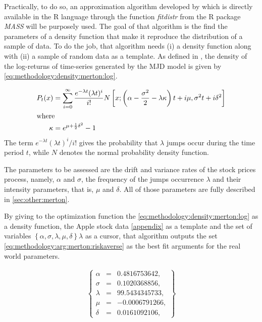 \documentclass[12pt]{report}
\begin{document}
Practically, to do so, an approximation algorithm developed by \citet{MASS} which is directly available in the R language through the function \textit{fitdistr} from the R package \textit{MASS} will be purposely used. 
The goal of that algorithm is the find the parameters of a density function that make it reproduce the distribution of a sample of data.
To do the job, that algorithm needs (i) a density function along with (ii) a sample of random data as a template.
As defined in \citet{matsuda2004}, the density of the log-returns of time-series generated by the MJD model is given by \cref{eq:methodology:density:merton:log}.

\begin{align}
  P_t(x) &= \sum_{i=0}^{\infty} 
    \frac{e^{-\lambda t} (\lambda t)^ i}{i!}
    N\left[ 
      x;
      \left( \alpha - \frac{\sigma^2}{2} - \lambda \kappa \right) t + i \mu,
      \sigma^2 t + i\delta^2
    \right]\label{eq:methodology:density:merton:log} \\
\intertext{where}
  \kappa &= e^{\mu + \frac{1}{2} \delta^2} - 1 \notag 
\end{align}
The term $e^{-\lambda t} (\lambda t)^ i / i!$ gives the probability that $\lambda$ jumps occur during the time period $t$, while $N$ denotes the normal probability density function.

The parameters to be assessed are the drift and variance rates of the stock prices process, namely, $\alpha$ and $\sigma$, the frequency of the jumps occurrence $\lambda$ and their intensity parameters, that is, $\mu$ and $\delta$.
All of those parameters are fully described in \cref{sec:other:merton}.

By giving to the optimization function the \cref{eq:methodology:density:merton:log} as a density function, the Apple stock data \cref{appendix} as a template and the set of variables 
$\left\{\alpha, \sigma, \lambda, \mu,  \delta  \right\}\lambda$ 
as a cursor, that algorithm outputs the set \ref{eq:methodology:arg:merton:riskaverse} as the best fit arguments for the real world parameters.

\begin{align}
  \left \{
  \begin{array}{lcl}
    \alpha &= &0.4816753642, \\
    \sigma &= &0.1020368856, \\
    \lambda &= &99.5434345733, \\
    \mu &= &-0.0006791266, \\
    \delta &= &0.0161092106, 
  \end{array}
  \right \}  
  \label{eq:methodology:arg:merton:riskaverse}
\end{align}
\end{document}
